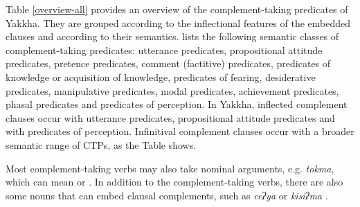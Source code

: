 Table \ref{overview-all} provides an overview of the complement-taking predicates of Yakkha. They are grouped according to the  inflectional features of the embedded clauses and according to their semantics.  \citet[120]{Noonan2007Complementation} lists the following semantic classes of complement-taking predicates: utterance predicates, propositional attitude predicates, pretence predicates, comment (factitive) predicates, predicates of knowledge or acquisition of knowledge, predicates of fearing, desiderative predicates, manipulative predicates, modal predicates, achievement predicates, phasal predicates and predicates of perception. In Yakkha, inflected complement clauses occur with utterance predicates, propositional attitude predicates and  with predicates of perception. Infinitival  complement clauses occur with a broader semantic range of CTPs, as the Table shows. 

Most complement-taking verbs may also take nominal arguments, e.g. \emph{tokma}, which can mean  or . In addition to the complement-taking verbs, there are also some nouns that can embed clausal complements, such as \emph{ceʔya}  or \emph{kisiʔma} . 


